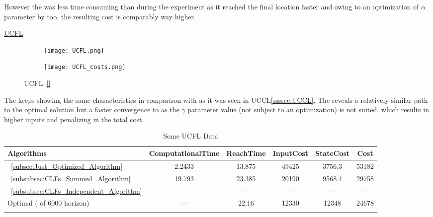 However the  was less time consuming than  during the experiment as it reached the final location faster and owing to an optimization of \(\alpha\) parameter by  too, the resulting cost is comparably way higher. \\

\newpage %

\underline{UCFL}
\label{UCFL} %


\begin{figure}[htbp]
  \begin{subfigure}{0.6\textwidth}
    \centering
    \texttt{[image: UCFL.png]}
  \label{fig:UCFL_CostEvol}
  \end{subfigure}
  \begin{subfigure}{0.59\textwidth}
    \centering
    \texttt{[image: UCFL\_costs.png]}
  \label{fig:UCFL_trajectory}
  \end{subfigure}
  \caption{UCFL~\ref{}}
\label{fig:UCFLTrajectory_and_CostEvol}
\end{figure}



The  keeps showing the same characteristics in comparison with  as it was seen in UCCL\ref{ssssec:UCCL}. The  reveals a relatively similar path to the optimal solution but a faster convergence to \txtref as the \(\gamma\) parameter value (not subject to an optimization) is not suited, which results in higher inputs and penalizing in the total cost. 



  \bgroup
 \begin{xltabular}{\textwidth}{|l|ccccc|}
   \toprule
   Algorithms   & ComputationalTime  & ReachTime  & InputCost   & StateCost & Cost           \\
   \midrule
    ~\ref{subsec:Just_Optimized_Algorithm}           & 2.2433 & 13.875  & 49425 & 3756.3 & 53182 \\
    ~\ref{subsubsec:CLFs_Summed_Algorithm}        & 19.793  & 23.385     & 20190 & 9568.4 & 29758 \\
    ~\ref{subsubsec:CLFs_Independent_Algorithm}   & ---   & ---      & ---  & ---  & ---  \\
    Optimal ( of 6000 horizon)                        & ---    & 22.16 & 12330  & 12348 & 24678 \\
    \midrule
    \caption{Some UCFL Data}
   \label{tab:Some_UCFL_Data}\\
   \end{xltabular}
 \egroup

